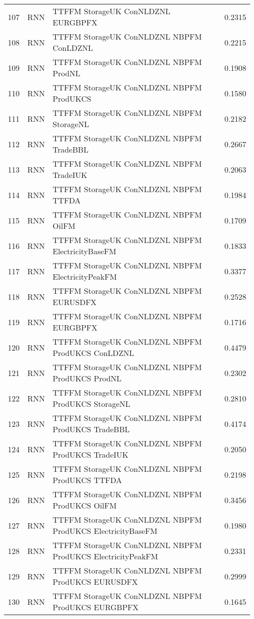 \begin{table}[ht]
\begin{tabular}{rllr}
  107 & RNN & TTFFM StorageUK ConNLDZNL EURGBPFX & 0.2315 \\ 
  108 & RNN & TTFFM StorageUK ConNLDZNL NBPFM ConLDZNL & 0.2215 \\ 
  109 & RNN & TTFFM StorageUK ConNLDZNL NBPFM ProdNL & 0.1908 \\ 
  110 & RNN & TTFFM StorageUK ConNLDZNL NBPFM ProdUKCS & 0.1580 \\ 
  111 & RNN & TTFFM StorageUK ConNLDZNL NBPFM StorageNL & 0.2182 \\ 
  112 & RNN & TTFFM StorageUK ConNLDZNL NBPFM TradeBBL & 0.2667 \\ 
  113 & RNN & TTFFM StorageUK ConNLDZNL NBPFM TradeIUK & 0.2063 \\ 
  114 & RNN & TTFFM StorageUK ConNLDZNL NBPFM TTFDA & 0.1984 \\ 
  115 & RNN & TTFFM StorageUK ConNLDZNL NBPFM OilFM & 0.1709 \\ 
  116 & RNN & TTFFM StorageUK ConNLDZNL NBPFM ElectricityBaseFM & 0.1833 \\ 
  117 & RNN & TTFFM StorageUK ConNLDZNL NBPFM ElectricityPeakFM & 0.3377 \\ 
  118 & RNN & TTFFM StorageUK ConNLDZNL NBPFM EURUSDFX & 0.2528 \\ 
  119 & RNN & TTFFM StorageUK ConNLDZNL NBPFM EURGBPFX & 0.1716 \\ 
  120 & RNN & TTFFM StorageUK ConNLDZNL NBPFM ProdUKCS ConLDZNL & 0.4479 \\ 
  121 & RNN & TTFFM StorageUK ConNLDZNL NBPFM ProdUKCS ProdNL & 0.2302 \\ 
  122 & RNN & TTFFM StorageUK ConNLDZNL NBPFM ProdUKCS StorageNL & 0.2810 \\ 
  123 & RNN & TTFFM StorageUK ConNLDZNL NBPFM ProdUKCS TradeBBL & 0.4174 \\ 
  124 & RNN & TTFFM StorageUK ConNLDZNL NBPFM ProdUKCS TradeIUK & 0.2050 \\ 
  125 & RNN & TTFFM StorageUK ConNLDZNL NBPFM ProdUKCS TTFDA & 0.2198 \\ 
  126 & RNN & TTFFM StorageUK ConNLDZNL NBPFM ProdUKCS OilFM & 0.3456 \\ 
  127 & RNN & TTFFM StorageUK ConNLDZNL NBPFM ProdUKCS ElectricityBaseFM & 0.1980 \\ 
  128 & RNN & TTFFM StorageUK ConNLDZNL NBPFM ProdUKCS ElectricityPeakFM & 0.2331 \\ 
  129 & RNN & TTFFM StorageUK ConNLDZNL NBPFM ProdUKCS EURUSDFX & 0.2999 \\ 
  130 & RNN & TTFFM StorageUK ConNLDZNL NBPFM ProdUKCS EURGBPFX & 0.1645 \\ 

\end{tabular}
\end{table}
